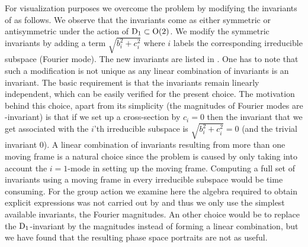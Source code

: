 For visualization purposes we overcome the problem by modifying
the invariants of  as follows. We observe
that the invariants come as either symmetric or antisymmetric
under the action of $\mathrm{D}_{1}\subset\mathrm{O}(2)$. We modify the
symmetric invariants by adding a term $\sqrt{b_i^2+c_i^2}$
where $i$ labels the corresponding irreducible subspace  (Fourier
mode). The new invariants are listed in
.
One has to note that such a modification is not unique as any
linear combination of invariants is an invariant. The basic
requirement is that the invariants remain linearly
independent, which can be easily verified for the present
choice. The motivation behind this choice, apart from its
simplicity (the magnitudes of Fourier modes are -invariant) is
that if we set up a cross-section by $c_i=0$ then the
invariant that we get associated with the $i$'th irreducible
subspace is $\sqrt{b_i^2+c_i^2}=0$ (and the trivial invariant
$0$). A linear combination of invariants resulting from more
than one moving frame is a natural choice since the problem
is caused by only taking into account the $i=1$-mode in
setting up the moving frame. Computing a full set of
invariants using a moving frame in every irreducible subspace
would be time consuming. For the group action we examine here
the algebra required to obtain explicit expressions was not
carried out by
and thus we only use the simplest available invariants, the
Fourier magnitudes. An other choice would be to replace the
$\mathrm{D}_{1}$-invariant by the magnitudes instead of forming a
linear combination, but we have found that the resulting
phase space portraits are not as useful.



